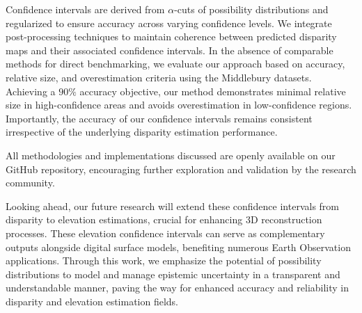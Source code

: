 Confidence intervals are derived from $\alpha$-cuts of possibility distributions and regularized to ensure accuracy across varying confidence levels. We integrate post-processing techniques to maintain coherence between predicted disparity maps and their associated confidence intervals. In the absence of comparable methods for direct benchmarking, we evaluate our approach based on accuracy, relative size, and overestimation criteria using the Middlebury datasets. Achieving a $90\%$ accuracy objective, our method demonstrates minimal relative size in high-confidence areas and avoids overestimation in low-confidence regions. Importantly, the accuracy of our confidence intervals remains consistent irrespective of the underlying disparity estimation performance.

All methodologies and implementations discussed are openly available on our GitHub repository, encouraging further exploration and validation by the research community.

Looking ahead, our future research will extend these confidence intervals from disparity to elevation estimations, crucial for enhancing 3D reconstruction processes. These elevation confidence intervals can serve as complementary outputs alongside digital surface models, benefiting numerous Earth Observation applications. Through this work, we emphasize the potential of possibility distributions to model and manage epistemic uncertainty in a transparent and understandable manner, paving the way for enhanced accuracy and reliability in disparity and elevation estimation fields.